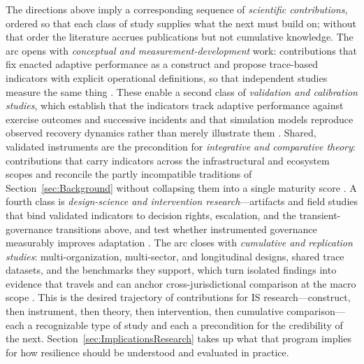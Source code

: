 The directions above imply a corresponding sequence of \emph{scientific contributions}, ordered so that each class of study supplies what the next must build on; without that order the literature accrues publications but not cumulative knowledge. The arc opens with \emph{conceptual and measurement-development} work: contributions that fix enacted adaptive performance as a construct and propose trace-based indicators with explicit operational definitions, so that independent studies measure the same thing \autocite{francis2014metric,hillmann2021organizational}. These enable a second class of \emph{validation and calibration studies}, which establish that the indicators track adaptive performance against exercise outcomes and successive incidents and that simulation models reproduce observed recovery dynamics rather than merely illustrate them \autocite{dawson2011agentbased,kwakkel2016comparing}. Shared, validated instruments are the precondition for \emph{integrative and comparative theory}: contributions that carry indicators across the infrastructural and ecosystem scopes and reconcile the partly incompatible traditions of Section~\ref{sec:Background} without collapsing them into a single maturity score \autocite{woods2015four,hillmann2021organizational}. A fourth class is \emph{design-science and intervention research}---artifacts and field studies that bind validated indicators to decision rights, escalation, and the transient-governance transitions above, and test whether instrumented governance measurably improves adaptation \autocite{boin2013resilient,bcbs2021operational}. The arc closes with \emph{cumulative and replication studies}: multi-organization, multi-sector, and longitudinal designs, shared trace datasets, and the benchmarks they support, which turn isolated findings into evidence that travels and can anchor cross-jurisdictional comparison at the macro scope \autocite{european2022regulation,gillard2023efficient}. This is the desired trajectory of contributions for IS research---construct, then instrument, then theory, then intervention, then cumulative comparison---each a recognizable type of study and each a precondition for the credibility of the next. Section~\ref{sec:ImplicationsResearch} takes up what that program implies for how resilience should be understood and evaluated in practice.
